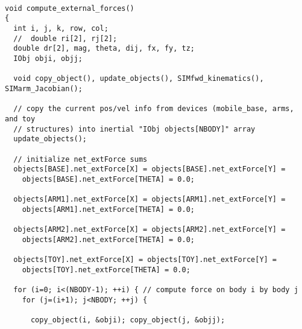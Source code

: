 \documentclass{article}
\begin{document}
\begin{verbatim}

void compute_external_forces()
{
  int i, j, k, row, col;
  //  double ri[2], rj[2];
  double dr[2], mag, theta, dij, fx, fy, tz;
  IObj obji, objj;

  void copy_object(), update_objects(), SIMfwd_kinematics(), SIMarm_Jacobian();

  // copy the current pos/vel info from devices (mobile_base, arms, and toy
  // structures) into inertial "IObj objects[NBODY]" array 
  update_objects();

  // initialize net_extForce sums
  objects[BASE].net_extForce[X] = objects[BASE].net_extForce[Y] =
    objects[BASE].net_extForce[THETA] = 0.0;

  objects[ARM1].net_extForce[X] = objects[ARM1].net_extForce[Y] =
    objects[ARM1].net_extForce[THETA] = 0.0;

  objects[ARM2].net_extForce[X] = objects[ARM2].net_extForce[Y] =
    objects[ARM2].net_extForce[THETA] = 0.0;

  objects[TOY].net_extForce[X] = objects[TOY].net_extForce[Y] =
    objects[TOY].net_extForce[THETA] = 0.0;
     
  for (i=0; i<(NBODY-1); ++i) { // compute force on body i by body j
    for (j=(i+1); j<NBODY; ++j) {

      copy_object(i, &obji); copy_object(j, &objj);


\end{verbatim}
\end{document}
